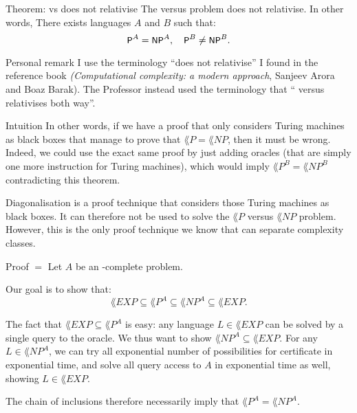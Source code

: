 \documentclass[a4paper]{article}
\begin{document}
\begin{parag}{Theorem:  vs  does not relativise}
    The  versus  problem does not relativise. In other words, There exists languages $A$ and $B$ such that: 
    \[\lang{P}^A = \lang{NP}^A, \mathspace \lang{P}^B \neq \lang{NP}^B.\]

    \begin{subparag}{Personal remark}
        I use the terminology ``does not relativise'' I found in the reference book \textit{(Computational complexity: a modern approach}, Sanjeev Arora and Boaz Barak). The Professor instead used the terminology that `` versus  relativises both way''. 
    \end{subparag}

    \begin{subparag}{Intuition}
        In other words, if we have a proof that only considers Turing machines as black boxes that manage to prove that $\lang{P} = \lang{NP}$, then it must be wrong. Indeed, we could use the exact same proof by just adding oracles (that are simply one more instruction for Turing machines), which would imply $\lang{P}^B = \lang{NP}^B$ contradicting this theorem.

        Diagonalisation is a proof technique that considers those Turing machines as black boxes. It can therefore not be used to solve the $\lang{P}$ versus $\lang{NP}$ problem. However, this is the only proof technique we know that can separate complexity classes.
    \end{subparag}

    \begin{subparag}{Proof $=$}
        Let $A$ be an -complete problem.

        Our goal is to show that: 
        \[\lang{EXP} \subseteq \lang{P}^A \subseteq \lang{NP}^A \subseteq \lang{EXP}.\]

        The fact that $\lang{EXP} \subseteq \lang{P}^A$ is easy: any language $L \in \lang{EXP}$ can be solved by a single query to the oracle. We thus want to show $\lang{NP}^A \subseteq \lang{EXP}$. For any $L \in \lang{NP}^A$, we can try all exponential number of possibilities for certificate in exponential time, and solve all query access to $A$ in exponential time as well, showing $L \in \lang{EXP}$.

        The chain of inclusions therefore necessarily imply that $\lang{P}^A = \lang{NP}^A$.
    \end{subparag}


\end{parag}
\end{document}
